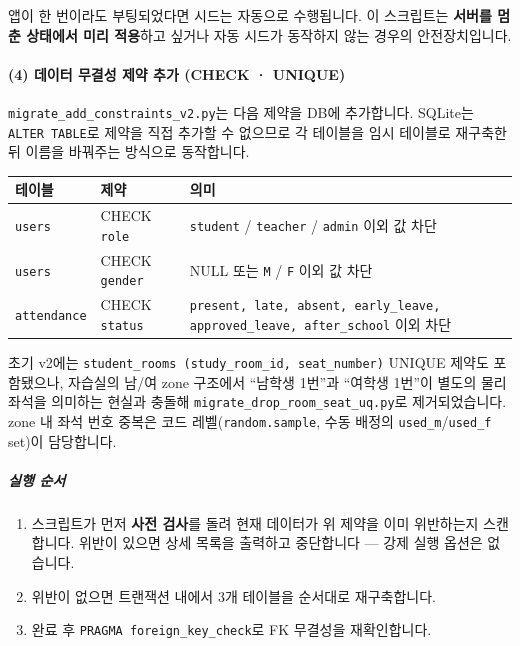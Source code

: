 \documentclass[a4paper,12pt]{article}
\begin{document}
\begin{notebox}
  앱이 한 번이라도 부팅되었다면 시드는 자동으로 수행됩니다.
  이 스크립트는 \textbf{서버를 멈춘 상태에서 미리 적용}하고 싶거나
  자동 시드가 동작하지 않는 경우의 안전장치입니다.
\end{notebox}

\paragraph{(4) 데이터 무결성 제약 추가 (CHECK · UNIQUE)}

\texttt{migrate\_add\_constraints\_v2.py}는 다음 제약을 DB에 추가합니다.
SQLite는 \texttt{ALTER TABLE}로 제약을 직접 추가할 수 없으므로 각 테이블을
임시 테이블로 재구축한 뒤 이름을 바꿔주는 방식으로 동작합니다.

\begin{center}
\begin{tabularx}{\textwidth}{llX}
\toprule
\textbf{테이블} & \textbf{제약} & \textbf{의미} \\
\midrule
\texttt{users}
  & CHECK \texttt{role}
  & \texttt{student} / \texttt{teacher} / \texttt{admin} 이외 값 차단 \\
\texttt{users}
  & CHECK \texttt{gender}
  & NULL 또는 \texttt{M} / \texttt{F} 이외 값 차단 \\
\texttt{attendance}
  & CHECK \texttt{status}
  & \texttt{present, late, absent, early\_leave, approved\_leave, after\_school} 이외 차단 \\
\bottomrule
\end{tabularx}
\end{center}

\begin{notebox}
  초기 v2에는 \texttt{student\_rooms (study\_room\_id, seat\_number)} UNIQUE 제약도 포함됐으나,
  자습실의 남/여 zone 구조에서 ``남학생 1번''과 ``여학생 1번''이 별도의 물리 좌석을 의미하는
  현실과 충돌해 \texttt{migrate\_drop\_room\_seat\_uq.py}로 제거되었습니다.
  zone 내 좌석 번호 중복은 코드 레벨(\texttt{random.sample}, 수동 배정의 \texttt{used\_m}/\texttt{used\_f}
  set)이 담당합니다.
\end{notebox}

\subparagraph*{실행 순서}

\begin{enumerate}[leftmargin=1.5em]
  \item 스크립트가 먼저 \textbf{사전 검사}를 돌려 현재 데이터가 위 제약을 이미 위반하는지 스캔합니다.
        위반이 있으면 상세 목록을 출력하고 중단합니다 --- 강제 실행 옵션은 없습니다.
  \item 위반이 없으면 트랜잭션 내에서 3개 테이블을 순서대로 재구축합니다.
  \item 완료 후 \texttt{PRAGMA foreign\_key\_check}로 FK 무결성을 재확인합니다.
\end{enumerate}
\end{document}
